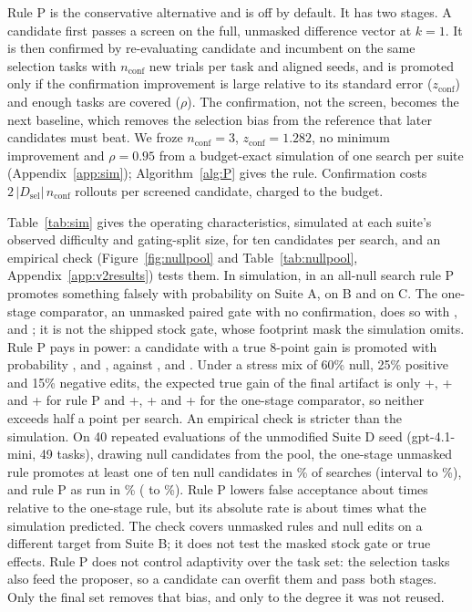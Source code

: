 Rule P is the conservative alternative and is off by default. It has two stages. A candidate first passes a screen on the full, unmasked difference vector at $k=1$. It is then confirmed by re-evaluating candidate and incumbent on the same selection tasks with $n_{\mathrm{conf}}$ new trials per task and aligned seeds, and is promoted only if the confirmation improvement is large relative to its standard error ($z_{\mathrm{conf}}$) and enough tasks are covered ($\rho$). The confirmation, not the screen, becomes the next baseline, which removes the selection bias from the reference that later candidates must beat. We froze $n_{\mathrm{conf}}=3$, $z_{\mathrm{conf}}=1.282$, no minimum improvement and $\rho=0.95$ from a budget-exact simulation of one search per suite (Appendix~\ref{app:sim}); Algorithm~\ref{alg:P} gives the rule. Confirmation costs $2\,|D_{\mathrm{sel}}|\,n_{\mathrm{conf}}$ rollouts per screened candidate, charged to the budget.

Table~\ref{tab:sim} gives the operating characteristics, simulated at each suite's observed difficulty and gating-split size, for ten candidates per search, and an empirical check (Figure~\ref{fig:nullpool} and Table~\ref{tab:nullpool}, Appendix~\ref{app:v2results}) tests them. In simulation, in an all-null search rule P promotes something falsely with probability \simPFalseA{} on Suite A, \simPFalseB{} on B and \simPFalseC{} on C. The one-stage comparator, an unmasked paired gate with no confirmation, does so with \simKoneFalseA{}, \simKoneFalseB{} and \simKoneFalseC{}; it is not the shipped stock gate, whose footprint mask the simulation omits. Rule P pays in power: a candidate with a true 8-point gain is promoted with probability \simPPowerEightA{}, \simPPowerEightB{} and \simPPowerEightC{}, against \simKonePowerEightA{}, \simKonePowerEightB{} and \simKonePowerEightC{}. Under a stress mix of 60\% null, 25\% positive and 15\% negative edits, the expected true gain of the final artifact is only +\simPGainA{}, +\simPGainB{} and +\simPGainC{} for rule P and +\simKoneGainA{}, +\simKoneGainB{} and +\simKoneGainC{} for the one-stage comparator, so neither exceeds half a point per search. An empirical check is stricter than the simulation. On 40 repeated evaluations of the unmodified Suite D seed (gpt-4.1-mini, 49 tasks), drawing null candidates from the pool, the one-stage unmasked rule promotes at least one of ten null candidates in \nullOneStageTen{}\% of searches (interval \nullOneStageTenLo{} to \nullOneStageTenHi{}\%), and rule P as run in \nullRulePTen{}\% (\nullRulePTenLo{} to \nullRulePTenHi{}\%). Rule P lowers false acceptance about \nullRatio{} times relative to the one-stage rule, but its absolute rate is about \nullSimRatio{} times what the simulation predicted. The check covers unmasked rules and null edits on a different target from Suite B; it does not test the masked stock gate or true effects. Rule P does not control adaptivity over the task set: the selection tasks also feed the proposer, so a candidate can overfit them and pass both stages. Only the final set removes that bias, and only to the degree it was not reused.

